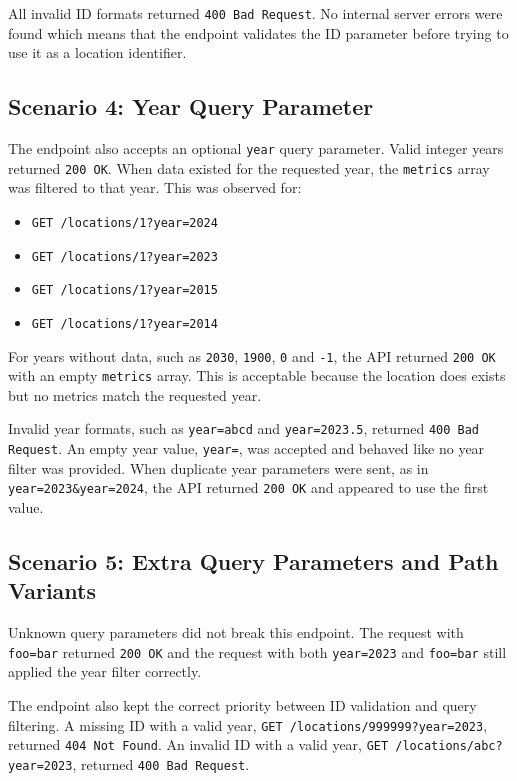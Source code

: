 All invalid ID formats returned \texttt{400 Bad Request}. No internal server errors were found which means that the endpoint validates the ID parameter before trying to use it as a location identifier.

\subsection{Scenario 4: Year Query Parameter}

The endpoint also accepts an optional \texttt{year} query parameter. Valid integer years returned \texttt{200 OK}. When data existed for the requested year, the \texttt{metrics} array was filtered to that year. This was observed for:

\begin{itemize}
    \item \texttt{GET /locations/1?year=2024}
    \item \texttt{GET /locations/1?year=2023}
    \item \texttt{GET /locations/1?year=2015}
    \item \texttt{GET /locations/1?year=2014}
\end{itemize}

For years without data, such as \texttt{2030}, \texttt{1900}, \texttt{0} and \texttt{-1}, the API returned \texttt{200 OK} with an empty \texttt{metrics} array. This is acceptable because the location does exists but no metrics match the requested year.

Invalid year formats, such as \texttt{year=abcd} and \texttt{year=2023.5}, returned \texttt{400 Bad Request}. An empty year value, \texttt{year=}, was accepted and behaved like no year filter was provided. When duplicate year parameters were sent, as in \texttt{year=2023\&year=2024}, the API returned \texttt{200 OK} and appeared to use the first value.

\subsection{Scenario 5: Extra Query Parameters and Path Variants}

Unknown query parameters did not break this endpoint. The request with \texttt{foo=bar} returned \texttt{200 OK} and the request with both \texttt{year=2023} and \texttt{foo=bar} still applied the year filter correctly.

The endpoint also kept the correct priority between ID validation and query filtering. A missing ID with a valid year, \texttt{GET /locations/999999?year=2023}, returned \texttt{404 Not Found}. An invalid ID with a valid year, \texttt{GET /locations/abc?year=2023}, returned \texttt{400 Bad Request}.

